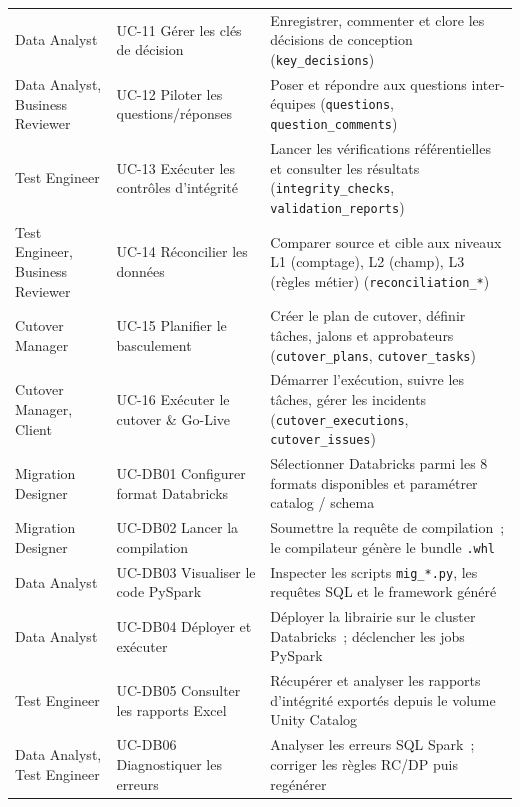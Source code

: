 \begin{table}[H]
\begin{tabularx}{\textwidth}{llX}
\addlinespace
Data Analyst &
  UC-11 Gérer les clés de décision &
  Enregistrer, commenter et clore les décisions de conception (\texttt{key\_decisions}) \\
\addlinespace
Data Analyst, Business Reviewer &
  UC-12 Piloter les questions/réponses &
  Poser et répondre aux questions inter-équipes (\texttt{questions}, \texttt{question\_comments}) \\
\addlinespace
Test Engineer &
  UC-13 Exécuter les contrôles d'intégrité &
  Lancer les vérifications référentielles et consulter les résultats (\texttt{integrity\_checks}, \texttt{validation\_reports}) \\
\addlinespace
Test Engineer, Business Reviewer &
  UC-14 Réconcilier les données &
  Comparer source et cible aux niveaux L1 (comptage), L2 (champ), L3 (règles métier) (\texttt{reconciliation\_*}) \\
\addlinespace
Cutover Manager &
  UC-15 Planifier le basculement &
  Créer le plan de cutover, définir tâches, jalons et approbateurs (\texttt{cutover\_plans}, \texttt{cutover\_tasks}) \\
\addlinespace
Cutover Manager, Client &
  UC-16 Exécuter le cutover \& Go-Live &
  Démarrer l'exécution, suivre les tâches, gérer les incidents (\texttt{cutover\_executions}, \texttt{cutover\_issues}) \\
\addlinespace
Migration Designer &
  UC-DB01 Configurer format Databricks &
  Sélectionner Databricks parmi les 8 formats disponibles et paramétrer catalog / schema \\
\addlinespace
Migration Designer &
  UC-DB02 Lancer la compilation &
  Soumettre la requête de compilation~; le compilateur génère le bundle \texttt{.whl} \\
\addlinespace
Data Analyst &
  UC-DB03 Visualiser le code PySpark &
  Inspecter les scripts \texttt{mig\_*.py}, les requêtes SQL et le framework généré \\
\addlinespace
Data Analyst &
  UC-DB04 Déployer et exécuter &
  Déployer la librairie sur le cluster Databricks~; déclencher les jobs PySpark \\
\addlinespace
Test Engineer &
  UC-DB05 Consulter les rapports Excel &
  Récupérer et analyser les rapports d'intégrité exportés depuis le volume Unity Catalog \\
\addlinespace
Data Analyst, Test Engineer &
  UC-DB06 Diagnostiquer les erreurs &
  Analyser les erreurs SQL Spark~; corriger les règles RC/DP puis regénérer \\
\bottomrule
\end{tabularx}
\end{table}

